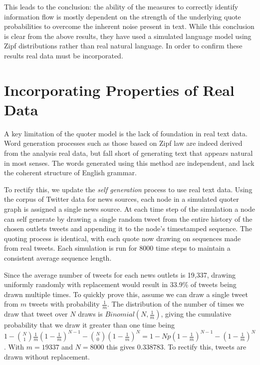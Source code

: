 This leads to the conclusion: the ability of the measures to correctly identify information flow is mostly dependent on the strength of the underlying quote probabilities to overcome the inherent noise present in text. While this conclusion is clear from the above results, they have used a simulated language model using Zipf distributions rather than real natural language. In order to confirm these results real data must be incorporated.


\section{Incorporating Properties of Real Data}
A key limitation of the quoter model is the lack of foundation in real text data. Word generation processes such as those based on Zipf law are indeed derived from the analysis real data, but fall short of generating text that appears natural in most senses. The words generated using this method are independent, and lack the coherent structure of English grammar.

To rectify this, we update the \emph{self generation} process to use real text data. Using the corpus of Twitter data for news sources, each node in a simulated quoter graph is assigned a single news source. At each time step of the simulation a node can self generate by drawing a single random tweet from the entire history of the chosen outlets tweets and appending it to the node's timestamped sequence. The quoting process is identical, with each quote now drawing on sequences made from real tweets. Each simulation is run for 8000 time steps to maintain a consistent average sequence length. 

Since the average number of tweets for each news outlets is 19,337, drawing uniformly randomly with replacement would result in 33.9\% of tweets being drawn multiple times. To quickly prove this, assume we can draw a single tweet from $m$ tweets with probability $\frac{1}{m}$. The distribution of the number of times we draw that tweet over $N$ draws is $Binomial(N, \frac{1}{m})$, giving the cumulative probability that we draw it greater than one time being $1-\binom{N}{1} \frac{1}{m}(1-\frac{1}{m})^{N-1} - \binom{N}{0} (1-\frac{1}{m})^N = 1- Np(1-\frac{1}{m})^{N-1} - (1-\frac{1}{m})^N$. With $m=19337$ and $N=8000$ this gives 0.338783. To rectify this, tweets are drawn without replacement. 

